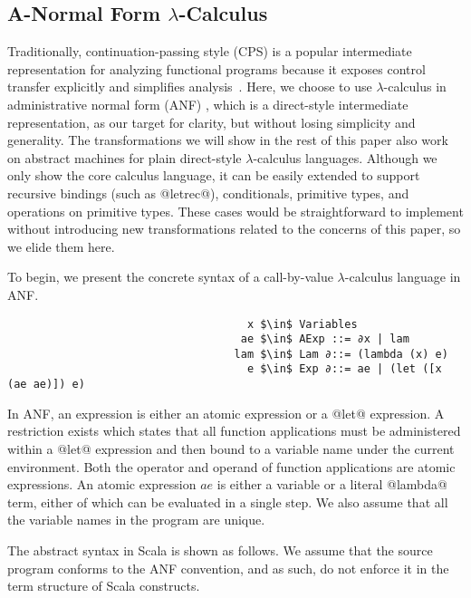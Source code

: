 \documentclass[acmsmall, review]{acmart}\settopmatter{}
\begin{document}
\subsection{A-Normal Form $\lambda$-Calculus} \label{anfsyntax}

Traditionally, continuation-passing style (CPS) is a popular intermediate representation
for analyzing functional programs because it exposes control transfer explicitly and 
simplifies analysis~\cite{Shivers:1991:SSC:115865.115884, Shivers:1988:CFA:53990.54007}.
Here, we choose to use $\lambda$-calculus in administrative normal form (ANF)
\cite{flanagan1993essence}, which is a direct-style intermediate representation, as our 
target for clarity, but without losing simplicity and generality. The transformations 
we will show in the rest of this paper also work on abstract machines for plain 
direct-style $\lambda$-calculus languages. Although we only show the core calculus language,
it can be easily extended to support recursive bindings (such as @letrec@), conditionals, 
primitive types, and operations on primitive types. These cases would be straightforward to
implement without introducing new transformations related to the concerns of this paper,
so we elide them here.

To begin, we present the concrete syntax of a call-by-value $\lambda$-calculus language
in ANF.

\begin{lstlisting}
                                     x $\in$ Variables
                                    ae $\in$ AExp ::= ∂x | lam
                                   lam $\in$ Lam ∂::= (lambda (x) e)
                                     e $\in$ Exp ∂::= ae | (let ([x (ae ae)]) e)
\end{lstlisting}

In ANF, an expression is either an atomic expression or a @let@ expression.
A restriction exists which states that all function applications must be administered
within a @let@ expression and then bound to a variable name under the current environment.
Both the operator and operand of function applications are atomic expressions.
An atomic expression $ae$ is either a variable or a literal @lambda@ term, either of which
can be evaluated in a single step. We also assume that all the variable names in the program
 are unique.

The abstract syntax in Scala is shown as follows. We assume that the source program conforms
to the ANF convention, and as such, do not enforce it in the term structure of Scala constructs.
\end{document}
